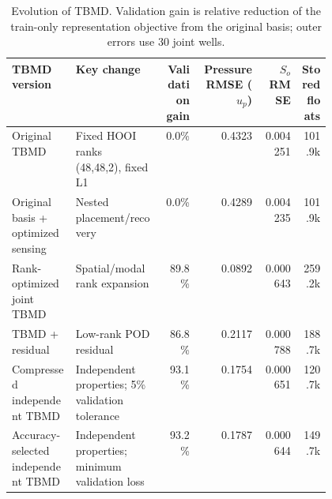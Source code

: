 \begin{table}[t]
\centering
\caption{Evolution of TBMD. Validation gain is relative reduction of the train-only representation objective from the original basis; outer errors use 30 joint wells.}
\label{tab:tbmd_evolution}
\footnotesize
\setlength{\tabcolsep}{2.5pt}
\begin{tabular}{@{}p{0.20\linewidth}p{0.27\linewidth}rrrr@{}}
\toprule
TBMD version & Key change & \shortstack{Validation\\gain} & \shortstack{Pressure\\RMSE ($u_p$)} & \shortstack{$S_o$\\RMSE} & \shortstack{Stored\\floats} \\
\midrule
Original TBMD & Fixed HOOI ranks (48,48,2), fixed L1 & 0.0\% & 0.4323 & 0.004251 & 101.9k \\
Original basis + optimized sensing & Nested placement/recovery & 0.0\% & 0.4289 & 0.004235 & 101.9k \\
Rank-optimized joint TBMD & Spatial/modal rank expansion & 89.8\% & 0.0892 & 0.000643 & 259.2k \\
TBMD + residual & Low-rank POD residual & 86.8\% & 0.2117 & 0.000788 & 188.7k \\
Compressed independent TBMD & Independent properties; 5\% validation tolerance & 93.1\% & 0.1754 & 0.000651 & 120.7k \\
Accuracy-selected independent TBMD & Independent properties; minimum validation loss & 93.2\% & 0.1787 & 0.000644 & 149.7k \\
\bottomrule
\end{tabular}
\end{table}
